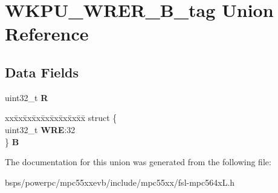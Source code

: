 \hypertarget{unionWKPU__WRER__32B__tag}{}\section{W\+K\+P\+U\+\_\+\+W\+R\+E\+R\+\_\+B\+\_\+tag Union Reference}
\label{unionWKPU__WRER__32B__tag}
\subsection*{Data Fields}
\begin{DoxyCompactItemize}
\item 
\mbox{\label{unionWKPU__WRER__32B__tag_a6f65e2f68e0f35b864101d2c68fb5689}} 
uint32\+\_\+t {\bfseries R}
\item 
\mbox{\label{unionWKPU__WRER__32B__tag_aaea60135576fb9a138f2955f57f1268b}} 
\begin{tabbing}
xx\=xx\=xx\=xx\=xx\=xx\=xx\=xx\=xx\=\kill
struct \{\\
\>uint32\_t {\bfseries WRE}:32\\
\} {\bfseries B}\\

\end{tabbing}\end{DoxyCompactItemize}


The documentation for this union was generated from the following file\+:\begin{DoxyCompactItemize}
\item 
bsps/powerpc/mpc55xxevb/include/mpc55xx/fsl-\/mpc564x\+L.\+h\end{DoxyCompactItemize}
